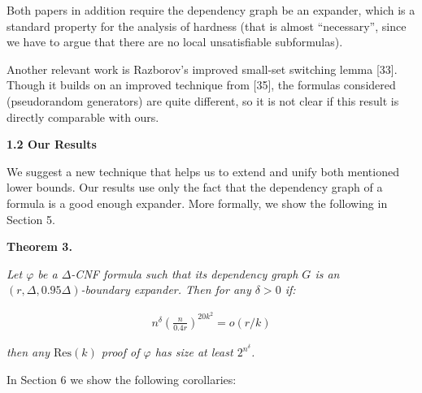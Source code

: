 Both papers in addition require the dependency graph be an expander, which is a standard property for the
analysis of hardness (that is almost “necessary”, since we have to argue that there are no local
unsatisfiable subformulas).\par




Another relevant work is Razborov’s improved small-set switching lemma [33]. Though it builds
on an improved technique from [35], the formulas considered
(pseudorandom generators) are quite different, so it is not clear if this result is directly comparable
with ours.\par






\par\medskip\noindent\textbf{
1.2 Our Results}\par




We suggest a new technique that helps us to extend and unify both mentioned lower bounds. Our results
use only the fact that the dependency graph of a formula is a good enough expander. More formally, we
show the following in Section 5.\par





\par\medskip\noindent\textbf{
\textbf{Theorem 3}\textbf{.}
}\par



\emph{Let $\varphi$ be a $\Delta$-CNF formula such that its dependency graph $G$ is an $(r,\Delta,0.95\Delta)$-boundary expander. Then for any $\delta>0$ if:}\par


\[\begin{gathered}
n^{\delta}\left(\frac{n}{0.4r}\right)^{20k^{2}}=o(r/k)
\end{gathered}\]


\emph{then any $\mathrm{Res}(k)$ proof of $\varphi$ has size at least $2^{n^{\delta}}$.}\par






In Section 6 we show the following corollaries:\par


